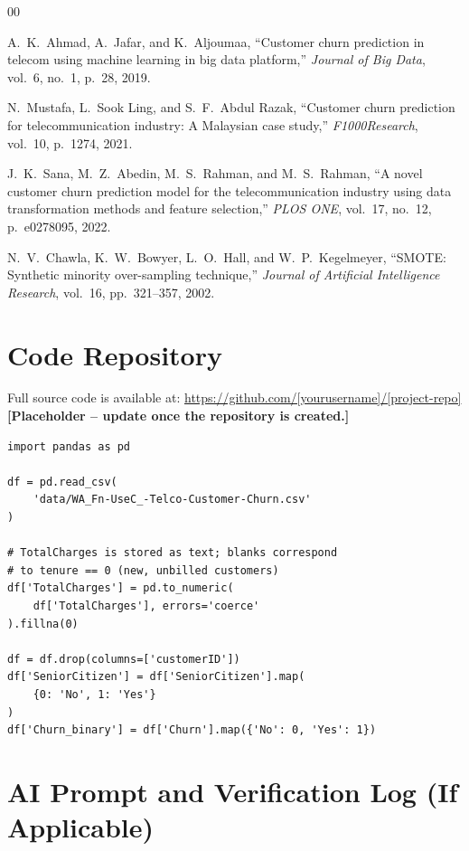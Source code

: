 \documentclass[conference]{IEEEtran}
\begin{document}
	\begin{thebibliography}{00}
		
		 A.~K.~Ahmad, A.~Jafar, and K.~Aljoumaa, ``Customer churn prediction in telecom using machine learning in big data platform,'' \textit{Journal of Big Data}, vol.~6, no.~1, p.~28, 2019.
		
		 N.~Mustafa, L.~Sook Ling, and S.~F.~Abdul Razak, ``Customer churn prediction for telecommunication industry: A Malaysian case study,'' \textit{F1000Research}, vol.~10, p.~1274, 2021.
		
		 J.~K.~Sana, M.~Z.~Abedin, M.~S.~Rahman, and M.~S.~Rahman, ``A novel customer churn prediction model for the telecommunication industry using data transformation methods and feature selection,'' \textit{PLOS ONE}, vol.~17, no.~12, p.~e0278095, 2022.
		
		 N.~V.~Chawla, K.~W.~Bowyer, L.~O.~Hall, and W.~P.~Kegelmeyer, ``SMOTE: Synthetic minority over-sampling technique,'' \textit{Journal of Artificial Intelligence Research}, vol.~16, pp.~321--357, 2002.
		
	\end{thebibliography}
	
	\newpage	
	\appendix
	
	\section{Code Repository}
	\label{app:code}
	
	Full source code is available at: \url{https://github.com/[yourusername]/[project-repo]} \textbf{[Placeholder -- update once the repository is created.]}
	
	\begin{lstlisting}[caption={Data Loading and Cleaning (excerpt)}, label={lst:preprocess}]
import pandas as pd

df = pd.read_csv(
    'data/WA_Fn-UseC_-Telco-Customer-Churn.csv'
)

# TotalCharges is stored as text; blanks correspond
# to tenure == 0 (new, unbilled customers)
df['TotalCharges'] = pd.to_numeric(
    df['TotalCharges'], errors='coerce'
).fillna(0)

df = df.drop(columns=['customerID'])
df['SeniorCitizen'] = df['SeniorCitizen'].map(
    {0: 'No', 1: 'Yes'}
)
df['Churn_binary'] = df['Churn'].map({'No': 0, 'Yes': 1})
	\end{lstlisting}
	
	\section{AI Prompt and Verification Log (If Applicable)}
	\label{app:ai_log}
	
\end{document}
